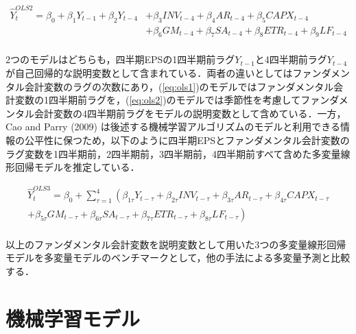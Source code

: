 \documentclass[a4paper，12pt]{jsarticle}
\begin{document}
\begin{equation}
  \begin{split}
    \label{eq:ols2}
    \hat{Y}_t^{OLS2} = \beta_0 + \beta_1Y_{t-1} + \beta_2Y_{t-4} 
    &+ \beta_3INV_{t-4} + \beta_4AR_{t-4} + \beta_5CAPX_{t-4} \\
    &+ \beta_6GM_{t-4} + \beta_7SA_{t-4} + \beta_8ETR_{t-4} + \beta_9LF_{t-4} \\
  \end{split}
\end{equation}

2つのモデルはどちらも，四半期EPSの1四半期前ラグ$Y_{t-1}$と4四半期前ラグ$Y_{t-4}$が自己回帰的な説明変数として含まれている．両者の違いとしてはファンダメンタル会計変数のラグの次数にあり，(\ref{eq:ols1})のモデルではファンダメンタル会計変数の1四半期前ラグを，(\ref{eq:ols2})のモデルでは季節性を考慮してファンダメンタル会計変数の4四半期前ラグをモデルの説明変数として含めている．一方，Cao and Parry (2009) は後述する機械学習アルゴリズムのモデルと利用できる情報の公平性に保つため，以下のように四半期EPSとファンダメンタル会計変数のラグ変数を1四半期前，2四半期前，3四半期前，4四半期前すべて含めた多変量線形回帰モデルを推定している．

\begin{equation}
  \begin{split}
    \label{eq:ols3}
    \hat{Y}_t^{OLS3} = \beta_0 + \sum^{4}_{\tau=1} \left( \beta_{1\tau}Y_{t-\tau} 
    + \beta_{2\tau}INV_{t-\tau} + \beta_{3\tau}AR_{t-\tau} + \beta_{4\tau}CAPX_{t-\tau} \right.\\
    \left.+ \beta_{5\tau}GM_{t-\tau} + \beta_{6\tau}SA_{t-\tau} + \beta_{7\tau}ETR_{t-\tau} + \beta_{8\tau}LF_{t-\tau} \right) \\
  \end{split}
\end{equation}

以上のファンダメンタル会計変数を説明変数として用いた3つの多変量線形回帰モデルを多変量モデルのベンチマークとして，他の手法による多変量予測と比較する．

\section{機械学習モデル}

\end{document}
